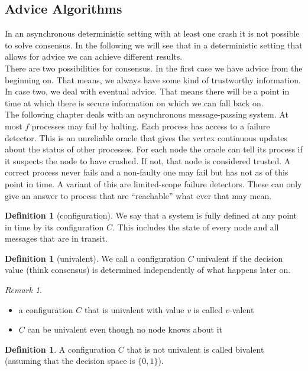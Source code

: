 \documentclass[a4paper, 12pt]{article}
\theoremstyle{plain}
\theoremstyle{definition}
\newtheorem{definition}[theorem]{Definition} %
\theoremstyle{lemma}
\theoremstyle{remark}
\newtheorem{remark}[theorem]{Remark}
\theoremstyle{corollary}
\theoremstyle{example}
\begin{document}
	\subsection{Advice Algorithms}
	In an asynchronous deterministic setting with at least one crash it is not possible to solve consensus. In the following we will see that in a deterministic setting that allows for advice we can achieve different results.\\
	There are two possibilities for consensus. In the first case we have advice from the beginning on. That means, we always have some kind of trustworthy information. In case two, we deal with eventual advice. That means there will be a point in time at which there is secure information on which we can fall back on.\\
	The following chapter deals with an asynchronous message-passing system. At most $f$ processes may fail by halting. Each process has access to a failure detector. This is an unreliable oracle that gives the vertex continuous updates about the status of other processes. For each node the oracle can tell its process if it suspects the node to have crashed. If not, that node is considered trusted. A correct process never fails and a non-faulty one may fail but has not as of this point in time. A variant of this are limited-scope failure detectors. These can only give an answer to process that are ``reachable'' what ever that may mean.
	\begin{definition}[configuration]
		We say that a system is fully defined at any point in time by its configuration $C$. This includes the state of every node and all messages that are in transit.
	\end{definition}
	\begin{definition}[univalent]
		We call a configuration $C$ univalent if the decision value (think consensus) is determined independently of what happens later on. 
	\end{definition}
	\begin{remark}
		\begin{itemize}
			\item a configuration $C$ that is univalent with value $v$ is called $v$-valent
			\item $C$ can be univalent even though no node knows about it
		\end{itemize}
	\end{remark}
	\begin{definition}
		A configuration $C$ that is not univalent is called bivalent (assuming that the decision space is $\{0,1\}$).
	\end{definition}
\end{document}
